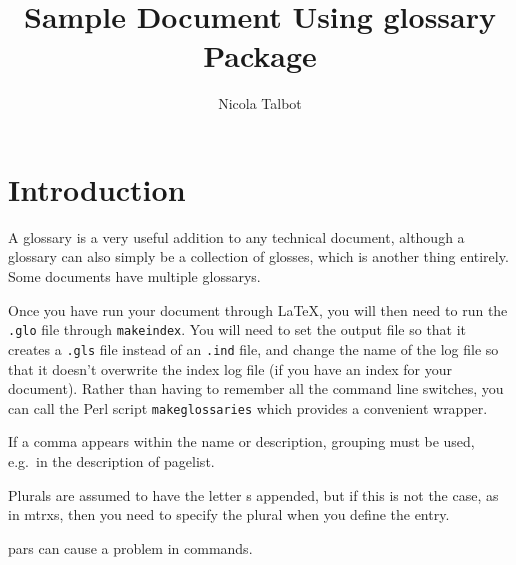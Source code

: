 \documentclass[a4paper]{report}
\begin{document}
\title{Sample Document Using glossary Package}
\author{Nicola Talbot}
\maketitle

\tableofcontents

\chapter{Introduction}

A \gls{glossary} is a very useful addition to any
technical document, although a \gls{glossary} can
also simply be a collection of glosses, which is
another thing entirely. Some documents have
multiple \glspl{glossary}.

Once you have run your document through \LaTeX, you
will then need to run the \texttt{.glo} file through
\texttt{makeindex}.  You will need to set the output
file so that it creates a \texttt{.gls} file instead
of an \texttt{.ind} file, and change the name of
the log file so that it doesn't overwrite the index
log file (if you have an index for your document).
Rather than having to remember all the command line
switches, you can call the \gls{Perl} script
\texttt{makeglossaries} which provides a convenient
wrapper.

If a comma appears within the name or description, grouping
must be used, e.g.\ in the description of \gls{pagelist}.

Plurals are assumed to have the letter s appended, but if
this is not the case, as in \glspl{mtrx}, then you need
to specify the plural when you define the entry.

\Glspl{par} can cause a problem in commands.

\printglossaries
\end{document}
